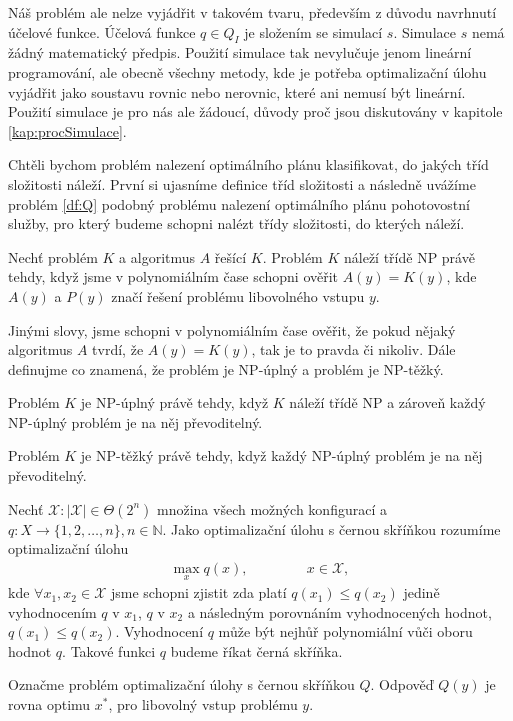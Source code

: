Náš problém ale nelze vyjádřit v takovém tvaru, především z důvodu navrhnutí účelové funkce.
Účelová funkce $q \in Q_I$ je složením se simulací $s$. Simulace $s$ nemá žádný matematický předpis.
Použití simulace tak nevylučuje jenom lineární programování, ale obecně všechny metody, kde je potřeba optimalizační úlohu vyjádřit jako
soustavu rovnic nebo nerovnic, které ani nemusí být lineární.
Použití simulace je pro nás ale žádoucí, důvody proč jsou diskutovány v kapitole \ref{kap:procSimulace}.

Chtěli bychom problém nalezení optimálního plánu klasifikovat, do jakých tříd složitosti náleží.
První si ujasníme definice tříd složitosti a následně uvážíme problém \ref{df:Q} podobný problému nalezení optimálního plánu pohotovostní služby,
pro který budeme schopni nalézt třídy složitosti, do kterých náleží.

\begin{definice}\label{df:NP}
  Nechť problém $K$ a algoritmus $A$ řešící $K$.
  Problém $K$ náleží třídě NP právě tehdy, když jsme v polynomiálním čase schopni ověřit
  $A(y) = K(y)$, kde $A(y)$ a $P(y)$ značí řešení problému libovolného vstupu $y$.
\end{definice}

Jinými slovy, jsme schopni v polynomiálním čase ověřit, že pokud nějaký algoritmus $A$ tvrdí, že $A(y) = K(y)$, tak je to pravda či nikoliv.
Dále definujme co znamená, že problém je NP-úplný a problém je NP-těžký.

\begin{definice}\label{df:NPup}
  Problém $K$ je NP-úplný právě tehdy, když $K$ náleží třídě NP a zároveň každý NP-úplný problém je na něj převoditelný.
\end{definice}

\begin{definice}\label{df:NPhard}
  Problém $K$ je NP-těžký právě tehdy, když každý NP-úplný problém je na něj převoditelný.
\end{definice}

\begin{definice}\label{df:Q}
  Nechť $\mathcal{X} \colon |\mathcal{X}| \in \Theta(2^n)$ množina všech možných konfigurací a $q \colon X \rightarrow \{ 1, 2, \dots, n \}, n \in \mathbb{N}$.
  Jako optimalizační úlohu s černou skříňkou rozumíme optimalizační úlohu
  \begin{align*}
    \max_{x} q(x), \hspace{50pt} x \in \mathcal{X},
  \end{align*}
  kde $\forall x_1, x_2 \in \mathcal{X}$ jsme schopni zjistit zda platí $q(x_1) \leq q(x_2)$ jedině vyhodnocením $q$ v $x_1$,
  $q$ v $x_2$ a následným porovnáním vyhodnocených hodnot, $q(x_1) \leq q(x_2)$.
  Vyhodnocení $q$ může být nejhůř polynomiální vůči oboru hodnot $q$.
  Takové funkci $q$ budeme říkat černá skříňka.

  Označme problém optimalizační úlohy s černou skříňkou $Q$.
  Odpověď $Q(y)$ je rovna optimu $x^*$, pro libovolný vstup problému $y$.
\end{definice}

